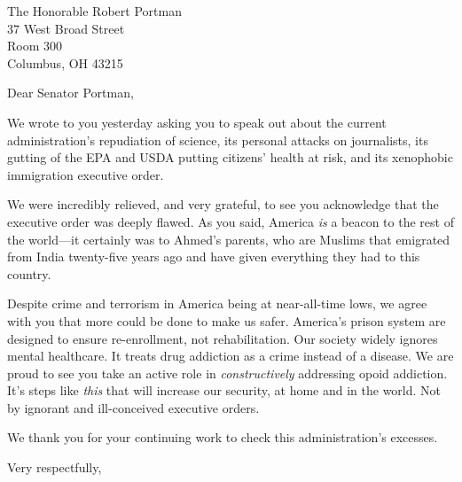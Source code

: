\documentclass{letter}
\begin{document}
\begin{letter}{
  The Honorable Robert Portman \\
  37 West Broad Street \\
  Room 300 \\
  Columbus, OH 43215}

\opening{Dear Senator Portman,}

We wrote to you yesterday asking you to speak out about the current administration's repudiation of science, its personal attacks on journalists, its gutting of the EPA and USDA putting citizens' health at risk, and its xenophobic immigration executive order.

We were incredibly relieved, and very grateful, to see you acknowledge that the executive order was deeply flawed. As you said, America {\em is} a beacon to the rest of the world---it certainly was to Ahmed's parents, who are Muslims that emigrated from India twenty-five years ago and have given everything they had to this country.

Despite crime and terrorism in America being at near-all-time lows, we agree with you that more could be done to make us safer. America’s prison system are designed to ensure re-enrollment, not rehabilitation. Our society widely ignores mental healthcare. It treats drug addiction as a crime instead of a disease. We are proud to see you take an active role in {\em constructively} addressing opoid addiction. It's steps like {\em this} that will increase our security, at home and in the world. Not by ignorant and ill-conceived executive orders.

We thank you for your continuing work to check this administration's excesses.

\closing{Very respectfully,}


\end{letter}
\end{document}
